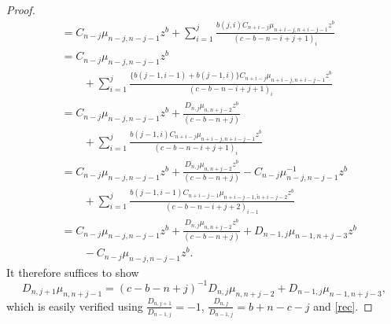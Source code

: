 \documentclass[12pt]{article}
\numberwithin{figure}{section}
\numberwithin{equation}{section}
\numberwithin{table}{section}
\begin{document}
\begin{proof}
\begin{align*}
&=C_{n-j}\mu_{n-j,n-j-1}z^b+\sum^j_{i=1}\frac{b(j,i)C_{n+i-j}\mu_{ n +i-j, n +i-j-1}z^b}{(c-b-n-i+j+1)_i}\\
&=C_{n-j}\mu_{n-j,n-j-1}z^b\\
&\qquad+\sum^j_{i=1}\frac{\{b(j-1,i-1)+b(j-1,i)\}C_{n+i-j}\mu_{ n +i-j, n +i-j-1}z^b}{(c-b-n-i+j+1)_i}\\
&=C_{n-j}\mu_{n-j,n-j-1}z^b+\frac{D_{n,j}\mu_{n,n+j-2}z^b}{(c-b-n+j)}\\
&\qquad+\sum^j_{i=1}\frac{b(j-1,i)C_{n+i-j}\mu_{ n +i-j, n +i-j-1}z^b}{(c-b-n-i+j+1)_i}\\
&=C_{n-j}\mu_{n-j,n-j-1}z^b+\frac{D_{n,j}\mu_{n,n+j-2}z^b}{(c-b-n+j)}-C_{n-j}\mu_{n-j,n-j-1}^{-1}z^b\\
&\qquad+\sum^j_{i=1}\frac{b(j-1,i-1)C_{n+i-j-1}\mu_{ n +i-j-1,\widetilde n +i-j-2}z^b}{(c-b-n-i+j+2)_{i-1}}\\
&=C_{n-j}\mu_{n-j,n-j-1}z^b+\frac{D_{n,j}\mu_{n,n+j-2}z^b}{(c-b-n+j)}+D_{n-1,j}\mu_{ n -1, n +j-3}z^b\\
&\qquad-C_{n-j}\mu_{n-j,n-j-1}z^b.
\end{align*}
It therefore suffices to show
$$D_{n,j+1}\mu_{n,n+j-1}=(c-b-n+j)^{-1}D_{n,j}\mu_{n,n+j-2}+D_{n-1,j}\mu_{ n -1, n +j-3},$$
which is easily verified using $\frac{D_{n,j+1}}{D_{n-1,j}}=-1$, $\frac{D_{n,j}}{D_{n-1,j}}=b+n-c-j$ and \eqref{rec}.

\end{proof}
\end{document}
